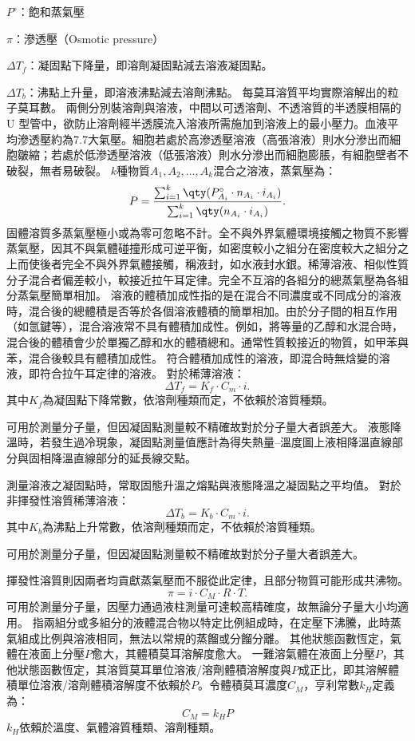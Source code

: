 \documentclass[a4paper,12pt]{article}
\begin{document}
\item $P^\circ$：飽和蒸氣壓
\item $\pi$：滲透壓（Osmotic pressure）
\item $\Delta T_f $：凝固點下降量，即溶劑凝固點減去溶液凝固點。
\item $\Delta T_b $：沸點上升量，即溶液沸點減去溶劑沸點。
\eit
{}
每莫耳溶質平均實際溶解出的粒子莫耳數。
兩側分別裝溶劑與溶液，中間以可透溶劑、不透溶質的半透膜相隔的 U 型管中，欲防止溶劑經半透膜流入溶液所需施加到溶液上的最小壓力。血液平均滲透壓約為7.7大氣壓。細胞若處於高滲透壓溶液（高張溶液）則水分滲出而細胞皺縮；若處於低滲透壓溶液（低張溶液）則水分滲出而細胞膨脹，有細胞壁者不破裂，無者易破裂。
$k$種物質$A_1, A_2, \ldots, A_k$混合之溶液，蒸氣壓為：
\[P =\frac{\sum_{i = 1}^k \qty(P^{ \circ} _{A_i} \cdot n_{A_i} \cdot i_{A_i})}{\sum_{i = 1}^k \qty(n_{A_i} \cdot i_{A_i})}.\]
固體溶質多蒸氣壓極小或為零可忽略不計。全不與外界氣體環境接觸之物質不影響蒸氣壓，因其不與氣體碰撞形成可逆平衡，如密度較小之組分在密度較大之組分之上而使後者完全不與外界氣體接觸，稱液封，如水液封水銀。稀薄溶液、相似性質分子混合者偏差較小，較接近拉午耳定律。完全不互溶的各組分的總蒸氣壓為各組分蒸氣壓簡單相加。
溶液的體積加成性指的是在混合不同濃度或不同成分的溶液時，混合後的總體積是否等於各個溶液體積的簡單相加。由於分子間的相互作用（如氫鍵等），混合溶液常不具有體積加成性。例如，將等量的乙醇和水混合時，混合後的體積會少於單獨乙醇和水的體積總和。通常性質較接近的物質，如甲苯與苯，混合後較具有體積加成性。
符合體積加成性的溶液，即混合時無焓變的溶液，即符合拉午耳定律的溶液。
對於稀薄溶液：
\[\Delta T_f = K_f \cdot C_m \cdot i.\]
其中$K_f$為凝固點下降常數，依溶劑種類而定，不依賴於溶質種類。

可用於測量分子量，但因凝固點測量較不精確故對於分子量大者誤差大。
液態降溫時，若發生過冷現象，凝固點測量值應計為得失熱量–溫度圖上液相降溫直線部分與固相降溫直線部分的延長線交點。

測量溶液之凝固點時，常取固態升溫之熔點與液態降溫之凝固點之平均值。
對於非揮發性溶質稀薄溶液：
\[\Delta T_b = K_b \cdot C_m \cdot i.\] 
其中$K_b$為沸點上升常數，依溶劑種類而定，不依賴於溶質種類。

可用於測量分子量，但因凝固點測量較不精確故對於分子量大者誤差大。

揮發性溶質則因兩者均貢獻蒸氣壓而不服從此定律，且部分物質可能形成共沸物。
\[\pi = i \cdot C_M \cdot R \cdot T.\]
可用於測量分子量，因壓力通過液柱測量可達較高精確度，故無論分子量大小均適用。
指兩組分或多組分的液體混合物以特定比例組成時，在定壓下沸騰，此時蒸氣組成比例與溶液相同，無法以常規的蒸餾或分餾分離。
其他狀態函數恆定，氣體在液面上分壓$P$愈大，其體積莫耳溶解度愈大。
一難溶氣體在液面上分壓$P$，其他狀態函數恆定，其溶質莫耳單位溶液/溶劑體積溶解度與$P$成正比，即其溶解體積單位溶液/溶劑體積溶解度不依賴於$P$。令體積莫耳濃度$C_M$，亨利常數$k_H$定義為：
\[C_M=k_HP\]
$k_H$依賴於溫度、氣體溶質種類、溶劑種類。
\end{document}
